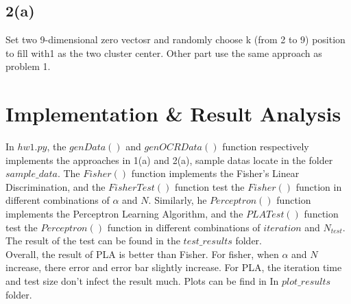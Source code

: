 \documentclass[11pt]{article}
\begin{document}
\subsection{2(a)}
Set two 9-dimensional zero vectosr and randomly choose k (from 2 to 9) position to fill with1 as the two cluster center. Other part use the same approach as problem 1.
\section{Implementation \& Result Analysis}
In $hw1.py$,  the $genData()$ and $genOCRData()$  function respectively implements the approaches in 1(a) and 2(a), sample datas locate in the folder $sample\_data$. The $Fisher()$ function implements the Fisher's Linear Discrimination, and the $FisherTest()$ function test the $Fisher()$ function in different combinations of $\alpha$ and $N$. Similarly, he $Perceptron()$ function implements the Perceptron Learning Algorithm, and the $PLATest()$ function test the $Perceptron()$ function in different combinations of $iteration$ and $N_{test}$. The result of the test can be found in the $test\_results$ folder.
\\Overall, the result of PLA is better than Fisher. For fisher, when $\alpha$ and $N$ increase, there error and error bar slightly increase. For PLA, the iteration time and test size don't infect the result much. Plots can be find in In $plot\_results$ folder.
\end{document}
